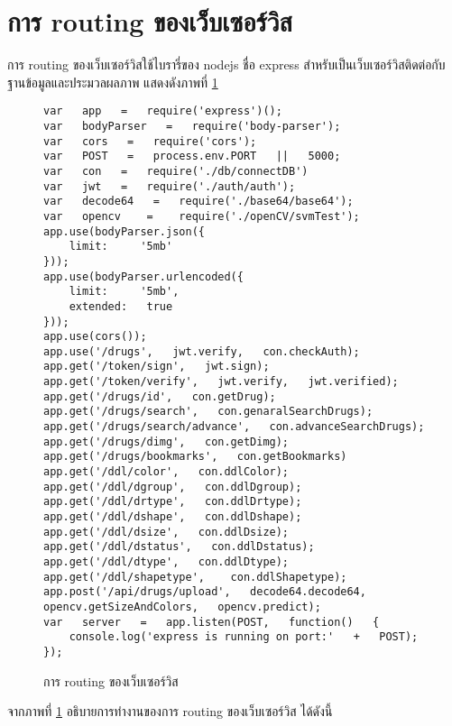 \section{การ routing ของเว็บเซอร์วิส}
การ routing ของเว็บเซอร์วิสใช้ไบรารี่ของ nodejs ชื่อ express 
สำหรับเป็นเว็บเซอร์วิสติดต่อกับฐานข้อมูลและประมวลผลภาพ 
แสดงดังภาพที่ \ref{Fig:expressRouting}

	\begin{figure}[H]
		{\begin{lstlisting}
var   app   =   require('express')();      
var   bodyParser   =   require('body-parser');      
var   cors   =   require('cors');      
var   POST   =   process.env.PORT   ||   5000;    
var   con   =   require('./db/connectDB')   
var   jwt   =   require('./auth/auth');      
var   decode64   =   require('./base64/base64');     
var   opencv    =    require('./openCV/svmTest');        
app.use(bodyParser.json({              
	limit:     '5mb'      
}));      
app.use(bodyParser.urlencoded({              
	limit:     '5mb',  
	extended:   true      
}));      
app.use(cors());      
app.use('/drugs',   jwt.verify,   con.checkAuth);    
app.get('/token/sign',   jwt.sign);      
app.get('/token/verify',   jwt.verify,   jwt.verified);    
app.get('/drugs/id',   con.getDrug);      
app.get('/drugs/search',   con.genaralSearchDrugs);      
app.get('/drugs/search/advance',   con.advanceSearchDrugs);      
app.get('/drugs/dimg',   con.getDimg);      
app.get('/drugs/bookmarks',   con.getBookmarks)  
app.get('/ddl/color',   con.ddlColor);      
app.get('/ddl/dgroup',   con.ddlDgroup);      
app.get('/ddl/drtype',   con.ddlDrtype);      
app.get('/ddl/dshape',   con.ddlDshape);      
app.get('/ddl/dsize',   con.ddlDsize);      
app.get('/ddl/dstatus',   con.ddlDstatus);      
app.get('/ddl/dtype',   con.ddlDtype);      
app.get('/ddl/shapetype',    con.ddlShapetype);      
app.post('/api/drugs/upload',   decode64.decode64,   opencv.getSizeAndColors,   opencv.predict);      
var   server   =   app.listen(POST,   function()   {              
	console.log('express is running on port:'   +   POST);      
});      
		\end{lstlisting}}
		\caption{การ routing ของเว็บเซอร์วิส}
		\label{Fig:expressRouting}
	\end{figure}
	จากภาพที่ \ref{Fig:expressRouting} อธิบายการทำงานของการ routing ของเว็บเซอร์วิส ได้ดังนี้
